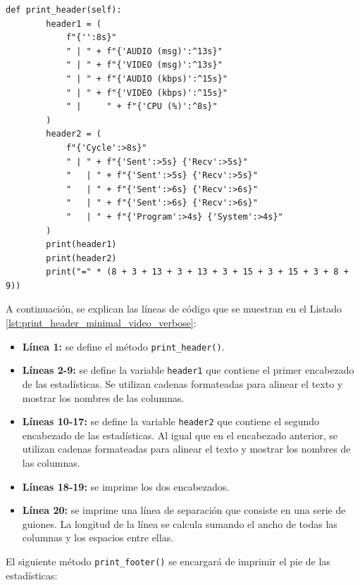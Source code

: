 \begin{lstlisting}[style=pythonstyle, caption={Método \texttt{print\_header()} de \textit{Minimal\_Video\_verbose}.}, label={lst:print_header_minimal_video_verbose}]
    def print_header(self):
        header1 = (
            f"{'':8s}"
            " | " + f"{'AUDIO (msg)':^13s}"
            " | " + f"{'VIDEO (msg)':^13s}"
            " | " + f"{'AUDIO (kbps)':^15s}"
            " | " + f"{'VIDEO (kbps)':^15s}"
            " |     " + f"{'CPU (%)':^8s}"
        )
        header2 = (
            f"{'Cycle':>8s}"
            " | " + f"{'Sent':>5s} {'Recv':>5s}"
            "   | " + f"{'Sent':>5s} {'Recv':>5s}"
            "   | " + f"{'Sent':>6s} {'Recv':>6s}"
            "   | " + f"{'Sent':>6s} {'Recv':>6s}"
            "   | " + f"{'Program':>4s} {'System':>4s}"
        )
        print(header1)
        print(header2)
        print("=" * (8 + 3 + 13 + 3 + 13 + 3 + 15 + 3 + 15 + 3 + 8 + 9))
\end{lstlisting}
\vspace{\baselineskip}

A continuación, se explican las líneas de código que se muestran en el Listado \ref{lst:print_header_minimal_video_verbose}:
\begin{itemize}
    \item \textbf{Línea 1:} se define el método \texttt{print\_header()}.
    \item \textbf{Líneas 2-9:} se define la variable \texttt{header1} que contiene el primer encabezado de las estadísticas. Se utilizan cadenas formateadas para alinear el texto y mostrar los nombres de las columnas.
    \item \textbf{Líneas 10-17:} se define la variable \texttt{header2} que contiene el segundo encabezado de las estadísticas. Al igual que en el encabezado anterior, se utilizan cadenas formateadas para alinear el texto y mostrar los nombres de las columnas.
    \item \textbf{Líneas 18-19:} se imprime los dos encabezados.
    \item \textbf{Línea 20:} se imprime una línea de separación que consiste en una serie de guiones. La longitud de la línea se calcula sumando el ancho de todas las columnas y los espacios entre ellas.
\end{itemize}

\vspace{\baselineskip}

El siguiente método \texttt{print\_footer()} se encargará de imprimir el pie de las estadísticas:


